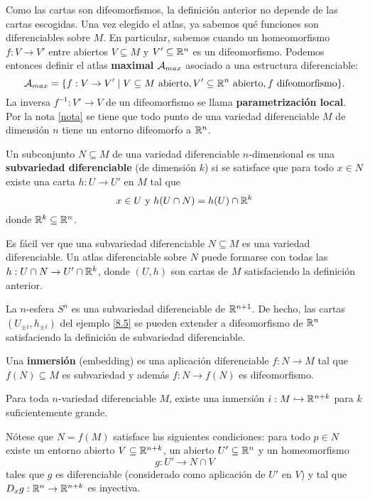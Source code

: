 \documentclass[CV.tex]{subfiles}
\begin{document}
Como las cartas son difeomorfismos, la definición anterior no depende de las cartas escogidas. Una vez elegido el atlas, ya sabemos qué funciones son diferenciables sobre $M$. En particular, sabemos cuando un homeomorfismo $f:V\to V'$ entre abiertos $V\subseteq M$ y $V'\subseteq\mathbb{R}^n$ es un difeomorfismo. Podemos entonces definir el atlas \textbf{maximal} $\mathcal{A}_{max}$ asociado a una estructura diferenciable:
\[
\mathcal{A}_{max}=\{f:V\to V'\mid V\subseteq M\text{ abierto}, V'\subseteq\mathbb{R}^n\text{ abierto}, f\text{ difeomorfismo}\}.
\]
La inversa $f^{-1}:V'\to V$ de un difeomorfismo se llama \textbf{parametrización local}. Por la nota \ref{nota} se tiene que todo punto de una variedad diferenciable $M$ de dimensión $n$ tiene un entorno difeomorfo a $\mathbb{R}^n$. 

\begin{defi}
Un subconjunto $N\subseteq M$ de una variedad diferenciable $n$-dimensional es una \textbf{subvariedad diferenciable} (de dimensión $k$) si se satisface que para todo $x\in N$ existe una carta $h:U\to U'$ en $M$ tal que 
\[
x\in U\text{ y } h(U\cap N)=h(U)\cap\mathbb{R}^k
\]
donde $\mathbb{R}^k\subseteq\mathbb{R}^n$. 
\end{defi}

Es fácil ver que una subvariedad diferenciable $N\subseteq M$ es una variedad diferenciable. Un atlas diferenciable sobre $N$ puede formarse con todas las $h:U\cap N\to U'\cap\mathbb{R}^k$, donde $(U,h)$ son cartas de $M$ satisfaciendo la definición anterior.

\begin{ej}
La $n$-esfera $S^n$ es una subvariedad diferenciable de $\mathbb{R}^{n+1}$. De hecho, las cartas $(U_{\pm i}, h_{\pm i})$ del ejemplo \ref{8.5} se pueden extender a difeomorfismo de $\mathbb{R}^n$ satisfaciendo la definición de subvariedad diferenciable. 
\end{ej}

\begin{defi}
Una \textbf{inmersión} (embedding) es una aplicación diferenciable $f:N\to M$ tal que $f(N)\subseteq M$ es subvariedad y además $f:N\to f(N)$ es difeomorfismo. 
\end{defi}

\begin{teorema}[Whitney]\label{Whitney}
Para toda $n$-variedad diferenciable $M$, existe una inmersión $i:M\hookrightarrow\mathbb{R}^{n+k}$ para $k$ suficientemente grande. 
\end{teorema}

Nótese que $N=f(M)$ satisface las siguientes condiciones: para todo $p\in N$ existe un entorno abierto $V\subseteq\mathbb{R}^{n+k}$, un abierto $U'\subseteq\mathbb{R}^n$ y un homeomorfismo
\[
g:U'\to N\cap V
\]
tales que $g$ es diferenciable (considerado como aplicación de $U'$ en $V$) y tal que $D_xg:\mathbb{R}^n\to\mathbb{R}^{n+k}$ es inyectiva. 
\end{document}
